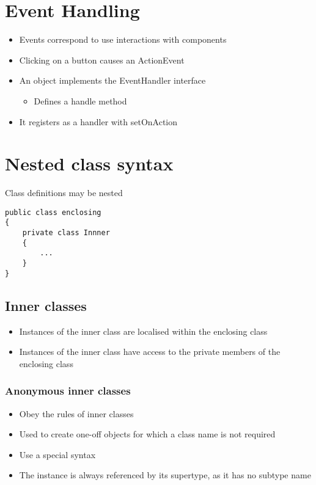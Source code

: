 \documentclass{article}[18pt]
\begin{document}
\section{Event Handling}
\begin{itemize}
	\item Events correspond to use interactions with components
	\item Clicking on a button causes an ActionEvent
	\item An object implements the EventHandler interface
	\begin{itemize}
		\item Defines a handle method
	\end{itemize}
	\item It registers as a handler with setOnAction
\end{itemize}
\section{Nested class syntax}
Class definitions may be nested
\begin{verbatim}
public class enclosing
{
	private class Innner
	{
		...
	}
}
\end{verbatim}
\subsection{Inner classes}
\begin{itemize}
	\item Instances of the inner class are localised within the enclosing class
	\item Instances of the inner class have access to the private members of the enclosing class
\end{itemize}
\subsubsection{Anonymous inner classes}
\begin{itemize}
	\item Obey the rules of inner classes
	\item Used to create one-off objects for which a class name is not required
	\item Use a special syntax
	\item The instance is always referenced by its supertype, as it has no subtype name
\end{itemize}
\end{document}
